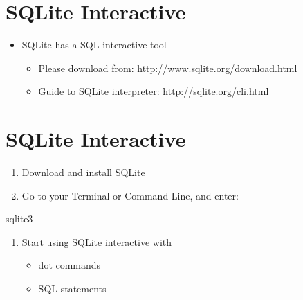 \documentclass[
  letterpaper,
]{scrbook}
\newenvironment{Shaded}{\begin{snugshade}}{\end{snugshade}}
\newcommand{\NormalTok}[1]{\textcolor[rgb]{0.00,0.23,0.31}{#1}}
\providecommand{\tightlist}{%
  \setlength{\itemsep}{0pt}\setlength{\parskip}{0pt}}
\begin{document}
\section*{SQLite Interactive}\label{sqlite-interactive}


\begin{itemize}
\tightlist
\item
  SQLite has a SQL interactive tool

  \begin{itemize}
  \tightlist
  \item
    Please download from: http://www.sqlite.org/download.html
  \item
    Guide to SQLite interpreter: http://sqlite.org/cli.html
  \end{itemize}
\end{itemize}

\section*{SQLite Interactive}\label{sqlite-interactive-1}


\begin{enumerate}
\def\labelenumi{\arabic{enumi}.}
\tightlist
\item
  Download and install SQLite
\item
  Go to your Terminal or Command Line, and enter:
\end{enumerate}

\begin{Shaded}
\begin{Highlighting}[]
\NormalTok{sqlite3}
\end{Highlighting}
\end{Shaded}

\begin{enumerate}
\def\labelenumi{\arabic{enumi}.}
\setcounter{enumi}{2}
\tightlist
\item
  Start using SQLite interactive with

  \begin{itemize}
  \tightlist
  \item
    dot commands
  \item
    SQL statements
  \end{itemize}
\end{enumerate}
\end{document}
